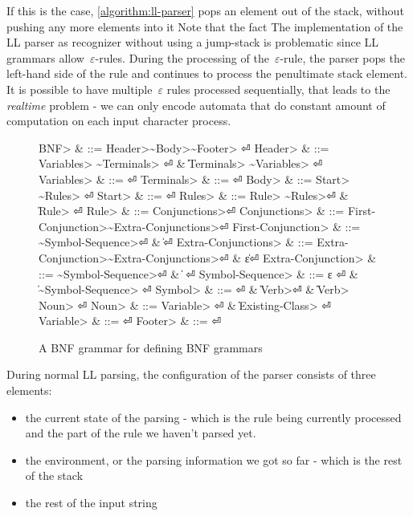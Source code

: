 If this is the case, \cref{algorithm:ll-parser}
pops an element out of the stack, without pushing any more elements into it
Note that the fact
The implementation of the LL parser as recognizer without using
a jump-stack is problematic since LL grammars allow~$ε$-rules.
During the processing of the~$ε$-rule, the parser pops the
left-hand side of the rule and continues to process the penultimate
stack element.
It is possible to have multiple~$ε$ rules processed sequentially,
that leads to the \textit{realtime} problem - we can only encode
automata that do constant amount of computation on each input character
process.

\begin{figure}[H]
  \begin{Grammar}
    \begin{aligned}
      \<BNF> & ::= \<Header>\~\<Body>\~\<Footer> \hfill⏎
      \<Header> & ::= \<Variables> \~\<Terminals> \hfill⏎
      {} & \| \<Terminals> \~\<Variables> \hfill⏎
      \<Variables> & ::= \hfill⏎
      \<Terminals> & ::= \hfill⏎
      \<Body> & ::= \<Start> \~\<Rules> \hfill⏎
      \<Start> & ::=  \hfill⏎
      \<Rules> & ::= \<Rule> \~\<Rules>\hfill⏎
      {} & \| \<Rule> \hfill⏎
      \<Rule> & ::=  \<Conjunctions>\hfill⏎
      \<Conjunctions> & ::= \<First-Conjunction>\~\<Extra-Conjunctions>\hfill⏎
      \<First-Conjunction> & ::= \~\<Symbol-Sequence>\hfill⏎
      {} & \| \hfill⏎
      \<Extra-Conjunctions> & ::= \<Extra-Conjunction>\~\<Extra-Conjunctions>\hfill⏎
      {} & \| ε\hfill⏎
      \<Extra-Conjunction> & ::= \~\<Symbol-Sequence>\hfill⏎
      {} & \|  \hfill⏎
      \<Symbol-Sequence> & ::= ε \hfill⏎
      {} & \| \~\<Symbol-Sequence> \hfill⏎
      \<Symbol> & ::=  \hfill⏎
      {} & \| \<Verb>\hfill⏎
      {} & \| \<Verb>~\cc{,} \<Noun> \hfill⏎
      \<Noun> & ::= \<Variable> \hfill⏎
      {} & \| \<Existing-Class> \hfill⏎
      \<Variable> & ::=  \hfill⏎
      \<Footer> & ::= \hfill⏎
    \end{aligned}
  \end{Grammar}
  \caption{A BNF grammar for defining BNF grammars}
  \label{Figure:BNF:BNF}
\end{figure}
During normal LL parsing, the configuration of the parser consists
  of three elements:
\begin{itemize}
  \item the current state of the parsing - which is the
    rule being currently processed and the part of the rule we
    haven't parsed yet.
  \item the environment, or the parsing information we got so far -
    which is the rest of the stack
  \item the rest of the input string
\end{itemize}


